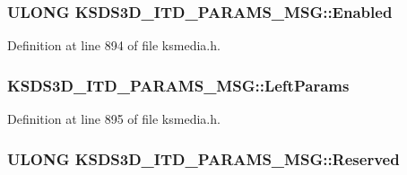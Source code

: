 \subsubsection[{\texorpdfstring{Enabled}{Enabled}}]{\setlength{\rightskip}{0pt plus 5cm}U\+L\+O\+NG K\+S\+D\+S3\+D\+\_\+\+I\+T\+D\+\_\+\+P\+A\+R\+A\+M\+S\+\_\+\+M\+S\+G\+::\+Enabled}\hypertarget{struct_k_s_d_s3_d___i_t_d___p_a_r_a_m_s___m_s_g_ac5eee51a281344a0cd587533db391d86}{}\label{struct_k_s_d_s3_d___i_t_d___p_a_r_a_m_s___m_s_g_ac5eee51a281344a0cd587533db391d86}


Definition at line 894 of file ksmedia.\+h.

\subsubsection[{\texorpdfstring{Left\+Params}{LeftParams}}]{ K\+S\+D\+S3\+D\+\_\+\+I\+T\+D\+\_\+\+P\+A\+R\+A\+M\+S\+\_\+\+M\+S\+G\+::\+Left\+Params}\hypertarget{struct_k_s_d_s3_d___i_t_d___p_a_r_a_m_s___m_s_g_a15ce8440179c74c0277ed22b99aedb3a}{}\label{struct_k_s_d_s3_d___i_t_d___p_a_r_a_m_s___m_s_g_a15ce8440179c74c0277ed22b99aedb3a}


Definition at line 895 of file ksmedia.\+h.

\subsubsection[{\texorpdfstring{Reserved}{Reserved}}]{\setlength{\rightskip}{0pt plus 5cm}U\+L\+O\+NG K\+S\+D\+S3\+D\+\_\+\+I\+T\+D\+\_\+\+P\+A\+R\+A\+M\+S\+\_\+\+M\+S\+G\+::\+Reserved}\hypertarget{struct_k_s_d_s3_d___i_t_d___p_a_r_a_m_s___m_s_g_a068b4739e6282c24630bc5580d634495}{}\label{struct_k_s_d_s3_d___i_t_d___p_a_r_a_m_s___m_s_g_a068b4739e6282c24630bc5580d634495}


